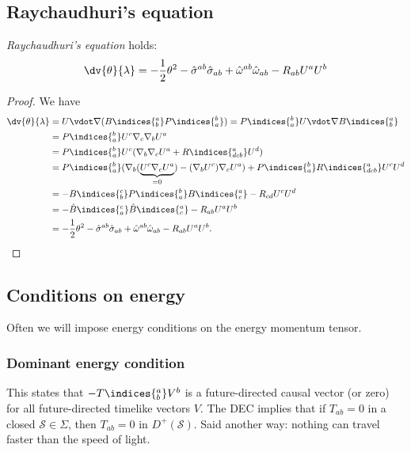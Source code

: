 \documentclass{jknotes}
\begin{document}
\subsection{Raychaudhuri's equation}
\begin{lemma}
    \emph{Raychaudhuri's equation} holds:
    \begin{equation}
        \dv{\theta}{\lambda} = -\frac{1}{2}\theta^2 - \hat{\sigma}^{ab}\hat{\sigma}_{ab} + \hat{\omega}^{ab}\hat{\omega}_{ab} - R_{ab}U^aU^b
    \end{equation}
\end{lemma}
\begin{proof}
    We have 
    \begin{align}
        \dv{\theta}{\lambda} &= U\vdot\nabla(B\indices{^a_b}P\indices{^b_a}) = P\indices{^b_a}U\vdot\nabla B\indices{^a_b} \\
                             &= P\indices{^b_a}U^c\nabla_c\nabla_b U^a \\
                             &= P\indices{^b_a}U^c(\nabla_b\nabla_c U^a + R\indices{^a_{dcb}}U^d) \\
                             &= P\indices{^b_a}(\nabla_b(\underbrace{U^c\nabla_cU^a}_{=0}) - (\nabla_bU^c)\nabla_cU^a) + P\indices{^b_a} R\indices{^a_{dcb}}U^cU^d \\
                             &= - B\indices{^c_b}P\indices{^b_a}B\indices{^a_c} - R_{cd} U^cU^d \\
                             &= -\hat{B}\indices{^c_a}\hat{B}\indices{^a_c} - R_{ab}U^aU^b \\
                             &= -\frac{1}{2}\theta^2 - \hat{\sigma}^{ab}\hat{\sigma}_{ab} + \hat{\omega}^{ab}\hat{\omega}_{ab} - R_{ab}U^aU^b.
    \end{align}
\end{proof}

\subsection{Conditions on energy}
Often we will impose energy conditions on the energy momentum tensor.

\subsubsection*{Dominant energy condition}
This states that \(-T\indices{^a_b}V^b\) is a future-directed causal vector (or zero) for all future-directed timelike vectors \(V\). The DEC implies that if \(T_{ab} = 0\) in a closed \(\mathcal{S} \in \Sigma\), then \(T_{ab} = 0\) in \(D^+(\mathcal{S})\). Said another way: nothing can travel faster than the speed of light.
\end{document}
